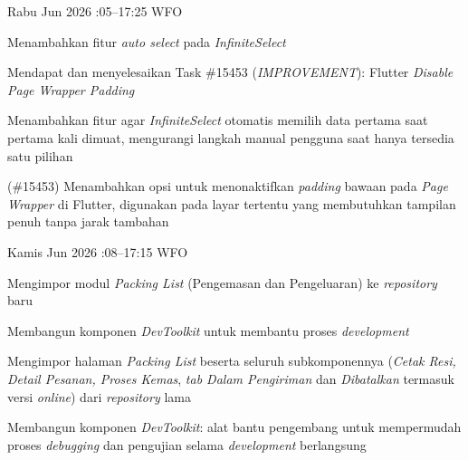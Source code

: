 \begin{logtable}
    {
        Rabu  Jun 2026 :05--17:25 \linebreak %
        WFO
    }{
        \begin{loglist}
            \item Menambahkan fitur \textit{auto select} pada \textit{InfiniteSelect}
            \item Mendapat dan menyelesaikan Task \#15453 (\textit{IMPROVEMENT}): Flutter
            \textit{Disable Page Wrapper Padding}
        \end{loglist}
    }{
        \begin{logwork}
            \item Menambahkan fitur agar \textit{InfiniteSelect} otomatis memilih data pertama
            saat pertama kali dimuat, mengurangi langkah manual pengguna saat hanya
            tersedia satu pilihan
            \item (\#15453) Menambahkan opsi untuk menonaktifkan \textit{padding} bawaan pada \textit{Page Wrapper} di Flutter, digunakan pada layar tertentu yang membutuhkan tampilan penuh tanpa jarak tambahan
        \end{logwork}
    }

    {
        Kamis  Jun 2026 :08--17:15 \linebreak %
        WFO
    }{
        \begin{loglist}
            \item Mengimpor modul \textit{Packing List} (Pengemasan dan Pengeluaran) ke
            \textit{repository} baru
            \item Membangun komponen \textit{DevToolkit} untuk membantu proses
            \textit{development}
        \end{loglist}
    }{
        \begin{logwork}
            \item Mengimpor halaman \textit{Packing List} beserta seluruh subkomponennya
            (\textit{Cetak Resi, Detail Pesanan, Proses Kemas}, \textit{tab Dalam
                Pengiriman} dan \textit{Dibatalkan} termasuk versi \textit{online}) dari
            \textit{repository} lama
            \item Membangun komponen \textit{DevToolkit}: alat bantu pengembang untuk mempermudah
            proses \textit{debugging} dan pengujian selama \textit{development} berlangsung
        \end{logwork}
    }


\end{logtable}

